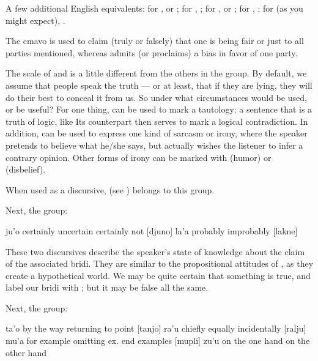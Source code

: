 A few additional English equivalents: for ,
     or ; for
    , ; for ,  or
    ; for , ; for
     (as you might expect), .

The cmavo  is used to claim (truly or falsely) that
    one is being fair or just to all parties mentioned, whereas
     admits (or proclaims) a bias in favor of one
    party.

The scale of  and  is a little different
    from the others in the group. By default, we assume that people
    speak the truth --- or at least, that if they are lying, they
    will do their best to conceal it from us. So under what
    circumstances would  be used, or  be useful?
    For one thing,  can be used to mark a tautology: a
    sentence that is a truth of logic, like 
    Its counterpart  then serves to mark a logical
    contradiction. In addition,  can be used to express
    one kind of sarcasm or irony, where the speaker pretends to
    believe what he/she says, but actually wishes the listener to
    infer a contrary opinion. Other forms of irony can be marked
    with  (humor) or  (disbelief).

When used as a discursive,  (see ) belongs to this group.

Next, the  group:

   ju'o    certainly   uncertain   certainly not
            [djuno]
    la'a    probably            improbably
            [lakne]

These two discursives describe the speaker's state of knowledge
    about the claim of the associated bridi. They are similar to
    the propositional attitudes of , as
    they create a hypothetical world. We may be quite certain that
    something is true, and label our bridi with ; but it
    may be false all the same. 

Next, the  group:

   ta'o    by the way          returning to point
            [tanjo]
    ra'u    chiefly     equally     incidentally
            [ralju]
    mu'a    for example omitting ex.    end examples
            [mupli]
    zu'u    on the one hand         on the other hand

